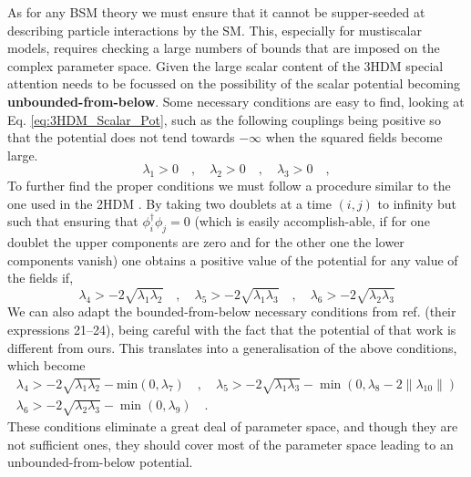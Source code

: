 As for any BSM theory we must ensure that it cannot be supper-seeded at describing particle interactions by the SM. This, especially for mustiscalar models, requires checking a large numbers of bounds that are imposed on the complex parameter space. 
%
%
Given the large scalar content of the 3HDM special attention needs to be focussed on the possibility of the scalar potential becoming \textbf{unbounded-from-below}.
% 
Some necessary conditions are easy to find, looking at Eq. \ref{eq:3HDM_Scalar_Pot}, such as the following couplings being positive so that the potential does not tend towards $-\infty$ when the squared fields become large. 
%
\begin{equation}
\lambda_1 > 0  \quad , \quad \lambda_2 > 0 \quad , \quad \lambda_3 > 0 \quad , 
\end{equation}
%
To further find the proper conditions we must follow a procedure similar to the one used in the 2HDM \cite{Branco_1996}. By taking two doublets at a time $(i, j)$ to infinity but such that ensuring that $\phi_i^\dagger \phi_j = 0$ (which is easily accomplish-able, if for one doublet the upper components are zero and for the other one the lower components vanish) one obtains a positive value of the potential for any value of the fields if,
%
\begin{equation}
\lambda_4 > -2 \sqrt{\lambda_1 \lambda_2} \quad , \quad \lambda_5 > -2 \sqrt{\lambda_1 \lambda_3} \quad , \quad \lambda_6 > -2 \sqrt{\lambda_2 \lambda_3}
\end{equation}
%
We can also adapt the bounded-from-below necessary conditions from ref. \cite{Moretti_2015} (their expressions 21–24), being careful with the fact that the potential of that work is different from ours. 
%
This translates into a generalisation of the above conditions, which become
%
\begin{equation}
\begin{gathered}
\lambda_4 > - 2 \sqrt{\lambda_1 \lambda_2} - \text{min}(0,\lambda_7) \quad , \quad  \lambda_5 > -2 \sqrt{\lambda_1 \lambda_3} - \min(0,\lambda_8 - 2\|\lambda_{10}\|)  \\
\lambda_6 > - 2 \sqrt{\lambda_2 \lambda_3} - \min(0,\lambda_9) \quad . 
\end{gathered} 
\end{equation}
%
These conditions eliminate a great deal of parameter space, and though they are not sufficient ones, they should cover most of the parameter space leading to an unbounded-from-below potential.


